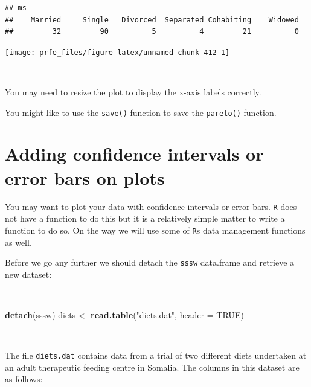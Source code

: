 \documentclass[12pt,a4paper]{book}
\newenvironment{Shaded}{\begin{snugshade}}{\end{snugshade}}
\newcommand{\KeywordTok}[1]{\textcolor[rgb]{0.13,0.29,0.53}{\textbf{#1}}}
\newcommand{\DataTypeTok}[1]{\textcolor[rgb]{0.13,0.29,0.53}{#1}}
\newcommand{\StringTok}[1]{\textcolor[rgb]{0.31,0.60,0.02}{#1}}
\newcommand{\OtherTok}[1]{\textcolor[rgb]{0.56,0.35,0.01}{#1}}
\newcommand{\NormalTok}[1]{#1}
\theoremstyle{definition}
\theoremstyle{definition}
\theoremstyle{definition}
\theoremstyle{remark}
\begin{document}
\begin{verbatim}
## ms
##    Married     Single   Divorced  Separated Cohabiting    Widowed 
##         32         90          5          4         21          0
\end{verbatim}

\begin{center}\texttt{[image: prfe\_files/figure-latex/unnamed-chunk-412-1]} \end{center}

~

You may need to resize the plot to display the x-axis labels correctly.

You might like to use the \texttt{save()} function to save the
\texttt{pareto()} function.

\newpage

\hypertarget{adding-confidence-intervals-or-error-bars-on-plots}{%
\section{Adding confidence intervals or error bars on
plots}\label{adding-confidence-intervals-or-error-bars-on-plots}}

You may want to plot your data with confidence intervals or error bars.
\texttt{R} does not have a function to do this but it is a relatively
simple matter to write a function to do so. On the way we will use some
of \texttt{R}s data management functions as well.

Before we go any further we should detach the \texttt{sssw} data.frame
and retrieve a new dataset:

~

\begin{Shaded}
\begin{Highlighting}[]
\KeywordTok{detach}\NormalTok{(sssw)}
\NormalTok{diets <-}\StringTok{ }\KeywordTok{read.table}\NormalTok{(}\StringTok{"diets.dat"}\NormalTok{, }\DataTypeTok{header =} \OtherTok{TRUE}\NormalTok{)}
\end{Highlighting}
\end{Shaded}

~

The file \texttt{diets.dat} contains data from a trial of two different
diets undertaken at an adult therapeutic feeding centre in Somalia. The
columns in this dataset are as follows:

~
\end{document}
